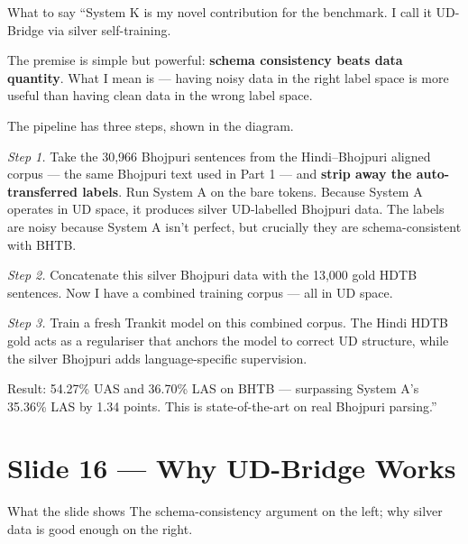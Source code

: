 \documentclass[11pt]{article}
\begin{document}
\begin{pitchbox}{What to say}
``System K is my novel contribution for the benchmark. I call it UD-Bridge via silver self-training.

The premise is simple but powerful: \textbf{schema consistency beats data quantity}. What I mean is --- having noisy data in the right label space is more useful than having clean data in the wrong label space.

The pipeline has three steps, shown in the diagram.

\textit{Step 1.} Take the 30,966 Bhojpuri sentences from the Hindi--Bhojpuri aligned corpus --- the same Bhojpuri text used in Part 1 --- and \textbf{strip away the auto-transferred labels}. Run System A on the bare tokens. Because System A operates in UD space, it produces silver UD-labelled Bhojpuri data. The labels are noisy because System A isn't perfect, but crucially they are schema-consistent with BHTB.

\textit{Step 2.} Concatenate this silver Bhojpuri data with the 13,000 gold HDTB sentences. Now I have a combined training corpus --- all in UD space.

\textit{Step 3.} Train a fresh Trankit model on this combined corpus. The Hindi HDTB gold acts as a regulariser that anchors the model to correct UD structure, while the silver Bhojpuri adds language-specific supervision.

Result: 54.27\% UAS and 36.70\% LAS on BHTB --- surpassing System A's 35.36\% LAS by 1.34 points. This is state-of-the-art on real Bhojpuri parsing.''
\end{pitchbox}

\section{Slide 16 --- Why UD-Bridge Works}

\begin{pitchbox}{What the slide shows}
The schema-consistency argument on the left; why silver data is good enough on the right.
\end{pitchbox}
\end{document}
